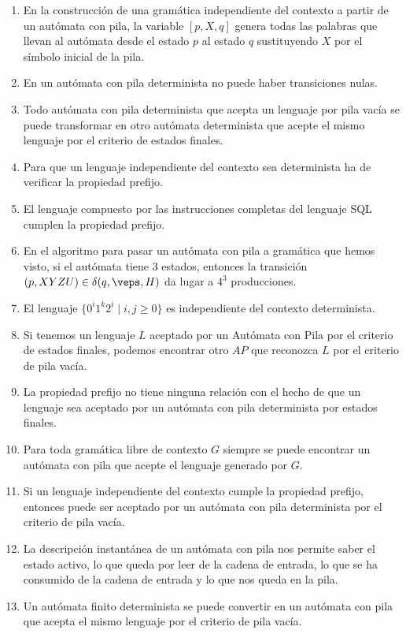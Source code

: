 \begin{enumerate}
    \item En la construcción de una gramática independiente del contexto a partir de un autómata con pila, la variable $[p,X,q]$ genera todas las palabras que llevan al autómata desde el estado $p$ al estado $q$ sustituyendo $X$ por el símbolo inicial de la pila.
    \item En un autómata con pila determinista no puede haber transiciones nulas.
    \item Todo autómata con pila determinista que acepta un lenguaje por pila vacía se puede transformar en otro autómata determinista que acepte el mismo lenguaje por el criterio de estados finales.
    \item Para que un lenguaje independiente del contexto sea determinista ha de verificar la propiedad prefijo.
    \item El lenguaje compuesto por las instrucciones completas del lenguaje SQL cumplen la propiedad prefijo.
    \item En el algoritmo para pasar un autómata con pila a gramática que hemos visto, si el autómata tiene 3 estados, entonces la transición $(p,XYZU) \in \delta(q,\veps, H)$ da lugar a $4^3$ producciones.
    \item El lenguaje $\{0^i 1^k 2^i \mid i,j\geq 0\}$ es independiente del contexto determinista.
    \item Si tenemos un lenguaje $L$ aceptado por un Autómata con Pila por el criterio de estados finales, podemos encontrar otro $AP$ que reconozca $L$ por el criterio de pila vacía.
    \item La propiedad prefijo no tiene ninguna relación con el hecho de que un lenguaje sea aceptado por un autómata con pila determinista por estados finales.
    \item Para toda gramática libre de contexto $G$ siempre se puede encontrar un autómata con pila que acepte el lenguaje generado por $G$.
    \item Si un lenguaje independiente del contexto cumple la propiedad prefijo, entonces puede ser aceptado por un autómata con pila determinista por el criterio de pila vacía.
    \item La descripción instantánea de un autómata con pila nos permite saber el estado activo, lo que queda por leer de la cadena de entrada, lo que se ha consumido de la cadena de entrada y lo que nos queda en la pila.
    \item Un autómata finito determinista se puede convertir en un autómata con pila que acepta el mismo lenguaje por el criterio de pila vacía.

\end{enumerate}
